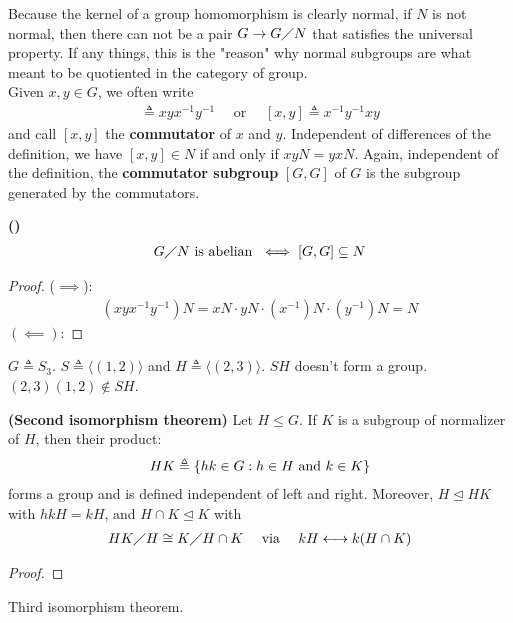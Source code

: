 \documentclass{report}
\begin{document}
Because the kernel of a group homomorphism is clearly normal, if $N$ is not normal, then there can not be a pair $G\rightarrow G\diagup N$ that satisfies the universal property.  If any things, this is the "reason" why normal subgroups are what meant to be quotiented in the category of group.  \\

Given $x,y \in G$, we often write  
\begin{align*}
[x,y]\triangleq xyx^{-1}y^{-1}\quad \text{ or }\quad [x,y]\triangleq x^{-1}y^{-1}xy
\end{align*}
and call $[x,y]$ the \textbf{commutator} of $x$ and  $y$. Independent of differences of the definition, we have $[x,y]\in N$ if and only if $xyN=yxN$. Again, independent of the definition, the \textbf{commutator subgroup} $[G,G]$ of $G$ is the subgroup generated by the commutators. 

\begin{theorem}
\textbf{()} 
\begin{align*}
G\diagup N\text{ is abelian }\iff [G,G] \subseteq N
\end{align*}
\end{theorem}
\begin{proof} 
  ($\implies$): 
\begin{align*}
  (xyx^{-1}y^{-1})N= xN \cdot yN \cdot (x^{-1})N \cdot (y^{-1} )N = N 
\end{align*}
$(\impliedby)$: 
\end{proof}


\begin{example}
$G\triangleq S_3$. $S\triangleq  \langle (1,2)\rangle $ and $H\triangleq \langle (2,3)\rangle $. $SH$ doesn't form a group. $(2,3)(1,2)\not \in SH$. 
\end{example}
\begin{theorem}
\textbf{(Second isomorphism theorem)} Let $H\leq G$. If $K$ is a subgroup of normalizer of $H$, then their product: 
\begin{align*}
HK\triangleq  \left\{ hk \in G: h \in H\text{ and } k \in K \right\}
\end{align*}
forms a group and is defined independent of left and right. Moreover, $H\trianglelefteq HK$ with $hkH=kH$, and $H\cap K \trianglelefteq K$ with 
\begin{align*}
HK \diagup H \cong  K \diagup H \cap K \quad \text{ via } \quad  kH  \longleftrightarrow k (H \cap K) 
\end{align*}
\end{theorem}
\begin{proof}

\end{proof}
Third isomorphism theorem. 
\end{document}
